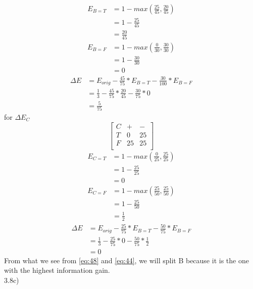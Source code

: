 \documentclass[12pt,english]{article}
\begin{document}
\begin{equation*}\tag{2}\label{eq:42}
\begin{split}
E_{B=T} &= 1 - max(\frac{25}{45},\frac{20}{45})\\
&=1 - \frac{25}{45}\\
&=\frac{20}{45}
\end{split}
\end{equation*}
\begin{equation*}\tag{3}\label{eq:43}
\begin{split}
E_{B=F} &= 1 - max(\frac{0}{30},\frac{30}{30})\\
&=1 - \frac{30}{30}\\
&=0
\end{split}
\end{equation*}
\begin{equation*}\tag{4}\label{eq:44}
\begin{split}
\Delta E &= E_{orig} - \frac{45}{75} * E_{B=T} - \frac{30}{100} * E_{B=F}\\
&= \frac{1}{3} -\frac{45}{75} *\frac{20}{45} - \frac{30}{75} *0\\
&= \frac{5}{75}
\end{split}
\end{equation*}
for $\Delta E_{C}$\\
\begin{equation*}\tag{5}\label{eq:45}
\begin{bmatrix} C & + & - \\T & 0 &  25 \\F & 25 & 25 \\ \end{bmatrix}
\end{equation*}
\begin{equation*}\tag{6}\label{eq:46}
\begin{split}
E_{C=T} &= 1 - max(\frac{0}{25},\frac{25}{25})\\
&=1 - \frac{25}{25}\\
&=0
\end{split}
\end{equation*}
\begin{equation*}\tag{7}\label{eq:47}
\begin{split}
E_{C=F} &= 1 - max(\frac{25}{50},\frac{25}{50})\\
&=1 - \frac{25}{50}\\
&=\frac{1}{2}
\end{split}
\end{equation*}
\begin{equation*}\tag{8}\label{eq:48}
\begin{split}
\Delta E &= E_{orig} - \frac{25}{75} * E_{B=T} - \frac{50}{75} * E_{B=F}\\
&= \frac{1}{3} -\frac{25}{75} * 0 - \frac{50}{75} *\frac{1}{2}\\
&= 0
\end{split}
\end{equation*}
From what we see from \eqref{eq:48} and \eqref{eq:44}, we will split B because it is the one with the highest information gain.\\
3.8c)\\
\end{document}
